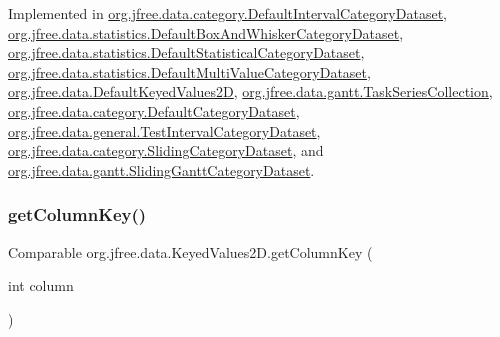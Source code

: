 Implemented in \mbox{\hyperlink{classorg_1_1jfree_1_1data_1_1category_1_1_default_interval_category_dataset_aa081b358d8813325db79019dafaa2c62}{org.\+jfree.\+data.\+category.\+Default\+Interval\+Category\+Dataset}}, \mbox{\hyperlink{classorg_1_1jfree_1_1data_1_1statistics_1_1_default_box_and_whisker_category_dataset_a2c2546143d897b391809f172566a1e00}{org.\+jfree.\+data.\+statistics.\+Default\+Box\+And\+Whisker\+Category\+Dataset}}, \mbox{\hyperlink{classorg_1_1jfree_1_1data_1_1statistics_1_1_default_statistical_category_dataset_af2dfd30fc9a145d8371467b02b269dc3}{org.\+jfree.\+data.\+statistics.\+Default\+Statistical\+Category\+Dataset}}, \mbox{\hyperlink{classorg_1_1jfree_1_1data_1_1statistics_1_1_default_multi_value_category_dataset_a1645d262991fd239a0a847d117dd975d}{org.\+jfree.\+data.\+statistics.\+Default\+Multi\+Value\+Category\+Dataset}}, \mbox{\hyperlink{classorg_1_1jfree_1_1data_1_1_default_keyed_values2_d_a7850b37a7f84b089906f1713b6fef6f0}{org.\+jfree.\+data.\+Default\+Keyed\+Values2D}}, \mbox{\hyperlink{classorg_1_1jfree_1_1data_1_1gantt_1_1_task_series_collection_a3d161e58090dcf60534fd670a387f429}{org.\+jfree.\+data.\+gantt.\+Task\+Series\+Collection}}, \mbox{\hyperlink{classorg_1_1jfree_1_1data_1_1category_1_1_default_category_dataset_abd03d702aa033c675c043d04578fdd16}{org.\+jfree.\+data.\+category.\+Default\+Category\+Dataset}}, \mbox{\hyperlink{classorg_1_1jfree_1_1data_1_1general_1_1_test_interval_category_dataset_a90dc04f1966adbcc80f505554c8afd40}{org.\+jfree.\+data.\+general.\+Test\+Interval\+Category\+Dataset}}, \mbox{\hyperlink{classorg_1_1jfree_1_1data_1_1category_1_1_sliding_category_dataset_a0860f901b12c1330b9b442e8b378e237}{org.\+jfree.\+data.\+category.\+Sliding\+Category\+Dataset}}, and \mbox{\hyperlink{classorg_1_1jfree_1_1data_1_1gantt_1_1_sliding_gantt_category_dataset_a4f7ede857998defbef577b37c3d62bc9}{org.\+jfree.\+data.\+gantt.\+Sliding\+Gantt\+Category\+Dataset}}.

\mbox{\label{interfaceorg_1_1jfree_1_1data_1_1_keyed_values2_d_a9ced6cbaf04f048db059e1ebf5184d2a}} 
\subsubsection{\texorpdfstring{get\+Column\+Key()}{getColumnKey()}}
{\footnotesize\ttfamily Comparable org.\+jfree.\+data.\+Keyed\+Values2\+D.\+get\+Column\+Key (\begin{DoxyParamCaption}\item[{int}]{column }\end{DoxyParamCaption})}

